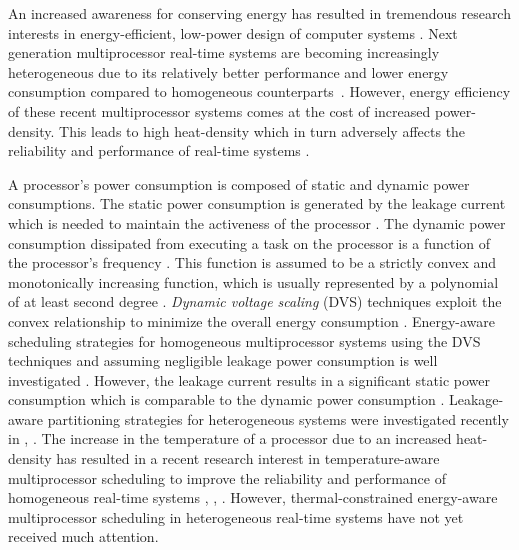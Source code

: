 \documentclass[conference]{IEEEtran}
\begin{document}
An increased awareness for conserving energy has resulted in tremendous research interests in energy-efficient, %
low-power design of computer systems \cite{Chen09}. 
Next generation multiprocessor real-time systems are becoming
increasingly heterogeneous due to its relatively better performance and lower energy consumption compared to homogeneous counterparts~\cite{Kumar06}. 
However, energy efficiency of these recent multiprocessor systems comes at the cost of increased power-density.
This leads to  high heat-density which  in turn adversely affects the reliability and
performance of real-time systems \cite{Wang10}.  


A processor's power consumption is composed of static and dynamic power consumptions. The static power consumption is 
generated by the leakage current which is needed to maintain the activeness of the processor \cite{Chen09}. The dynamic power
consumption dissipated from executing a task on the processor 
is a function of the processor's frequency \cite{Aydin03}. This function is assumed to be a strictly convex and monotonically increasing function, 
which is usually represented by a polynomial of at least second degree \cite{Chen05}.
\emph{Dynamic voltage scaling} (DVS) techniques exploit the convex relationship to minimize the overall energy consumption \cite{Hong98}.
Energy-aware scheduling strategies for homogeneous multiprocessor systems using the DVS techniques and assuming negligible 
leakage power consumption is well investigated  \cite{Chen07}. %
However, the leakage current results in a significant static power consumption which is comparable to the dynamic power consumption \cite{Langen06}.
Leakage-aware partitioning strategies for heterogeneous systems were investigated recently in \cite{Chen09}, \cite{Langen09}.
The increase in the temperature of a processor due to an increased heat-density 
has resulted in a recent  
research interest in temperature-aware multiprocessor scheduling 
to improve the reliability and performance of homogeneous real-time systems \cite{Chantem10}, \cite{Quan10}, \cite{Fisher09}.
However, thermal-constrained energy-aware multiprocessor scheduling in heterogeneous real-time systems have not yet received much attention. 
\end{document}
